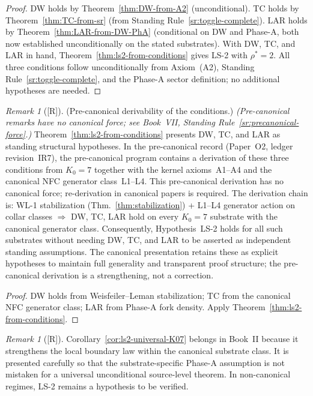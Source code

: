 \documentclass[12pt,oneside]{amsbook}
\theoremstyle{plain}
\theoremstyle{definition}
\theoremstyle{remark}
\newtheorem{remark}[theorem]{Remark}
\newcommand{\status}[1]{\textup{[#1]}}
\begin{document}
\begin{proof}
DW holds by Theorem~\ref{thm:DW-from-A2} (unconditional).
TC holds by Theorem~\ref{thm:TC-from-sr} (from Standing Rule~\ref{sr:toggle-complete}).
LAR holds by Theorem~\ref{thm:LAR-from-DW-PhA} (conditional on DW and Phase-A,
both now established unconditionally on the stated substrates).
With DW, TC, and LAR in hand, Theorem~\ref{thm:ls2-from-conditions} gives
LS-2 with $\rho^* = 2$.
All three conditions follow unconditionally from Axiom~(A2),
Standing Rule~\ref{sr:toggle-complete}, and the Phase-A sector definition;
no additional hypotheses are needed.
\end{proof}

\begin{remark}[\status{R}]
\textup{(Pre-canonical derivability of the conditions.)}
\textit{(Pre-canonical remarks have no canonical force;
see Book~VII, Standing Rule~\ref{sr:precanonical-force}.)}  
Theorem~\ref{thm:ls2-from-conditions} presents DW, TC, and LAR as
standing structural hypotheses.  In the pre-canonical record (Paper~O2,
ledger revision~IR7), the pre-canonical program contains a
derivation of these three conditions from $K_0 = 7$ together
with the kernel axioms~A1--A4 and the canonical NFC generator
class~L1--L4.  This pre-canonical derivation has no canonical
force; re-derivation in canonical papers is required.  The derivation chain is:
WL-1 stabilization (Thm.~\ref{thm:stabilization}) + L1--L4 generator
action on collar classes $\Rightarrow$ DW, TC, LAR hold on every
$K_0 = 7$ substrate with the canonical generator class.
Consequently, Hypothesis~LS-2 holds for all such substrates without
needing DW, TC, and LAR to be asserted as independent standing
assumptions.  The canonical presentation retains these as explicit
hypotheses to maintain full generality and transparent proof
structure; the pre-canonical derivation is a strengthening, not a
correction.
\end{remark}

\begin{proof}
DW holds from Weisfeiler--Leman stabilization; TC from the canonical
NFC generator class; LAR from Phase-A fork density.  Apply
Theorem~\ref{thm:ls2-from-conditions}.
\end{proof}

\begin{remark}[\status{R}]
Corollary~\ref{cor:ls2-universal-K07} belongs in Book~II because it
strengthens the local boundary law within the canonical substrate
class.  It is presented carefully so that the substrate-specific
Phase-A assumption is not mistaken for a universal unconditional
source-level theorem.  In non-canonical regimes, LS-2 remains a
hypothesis to be verified.
\end{remark}
\end{document}
